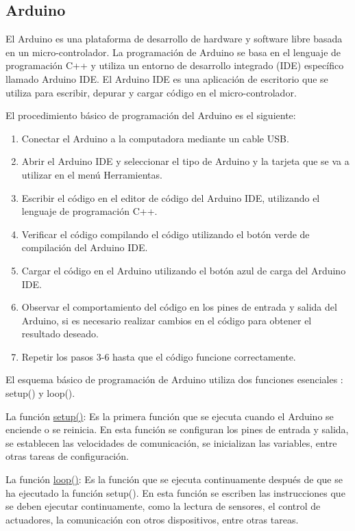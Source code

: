\subsection{Arduino}

El Arduino es una plataforma de desarrollo de hardware y software libre basada en un micro-controlador. La programación de Arduino se basa en el lenguaje de programación C++ y utiliza un entorno de desarrollo integrado (IDE) específico llamado Arduino IDE. El Arduino IDE es una aplicación de escritorio que se utiliza para escribir, depurar y cargar código en el micro-controlador.

El procedimiento básico de programación del Arduino es el siguiente:

\begin{enumerate}
    \item Conectar el Arduino a la computadora mediante un cable USB.
    \item Abrir el Arduino IDE y seleccionar el tipo de Arduino y la tarjeta que se va a utilizar en el menú Herramientas.
    \item Escribir el código en el editor de código del Arduino IDE, utilizando el lenguaje de programación C++.
    \item Verificar el código compilando el código utilizando el botón verde de compilación del Arduino IDE.
    \item Cargar el código en el Arduino utilizando el botón azul de carga del Arduino IDE.
    \item Observar el comportamiento del código en los pines de entrada y salida del Arduino, si es necesario realizar cambios en el código para obtener el resultado deseado.
    \item Repetir los pasos 3-6 hasta que el código funcione correctamente.
\end{enumerate}

El esquema básico de programación de Arduino utiliza dos funciones esenciales \cite{margolis2020arduino}: setup() y loop().

La función \href{https://www.arduino.cc/reference/en/language/structure/sketch/setup/}{setup()}: Es la primera función que se ejecuta cuando el Arduino se enciende o se reinicia. En esta función se configuran los pines de entrada y salida, se establecen las velocidades de comunicación, se inicializan las variables, entre otras tareas de configuración. 

La función \href{https://www.arduino.cc/reference/en/language/structure/sketch/loop/}{loop()}: Es la función que se ejecuta continuamente después de que se ha ejecutado la función setup(). En esta función se escriben las instrucciones que se deben ejecutar continuamente, como la lectura de sensores, el control de actuadores, la comunicación con otros dispositivos, entre otras tareas.


